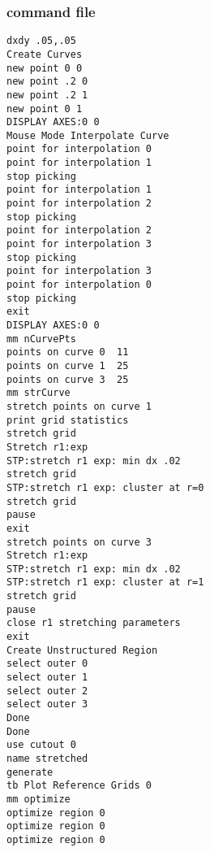 \documentclass[letterpaper,12pt]{article}
\begin{document}
\subsubsection{command file}
\begin{verbatim}
dxdy .05,.05
Create Curves
new point 0 0
new point .2 0
new point .2 1
new point 0 1
DISPLAY AXES:0 0
Mouse Mode Interpolate Curve
point for interpolation 0
point for interpolation 1
stop picking
point for interpolation 1
point for interpolation 2
stop picking
point for interpolation 2
point for interpolation 3
stop picking
point for interpolation 3
point for interpolation 0
stop picking
exit
DISPLAY AXES:0 0
mm nCurvePts
points on curve 0  11
points on curve 1  25
points on curve 3  25
mm strCurve
stretch points on curve 1
print grid statistics
stretch grid
Stretch r1:exp
STP:stretch r1 exp: min dx .02
stretch grid
STP:stretch r1 exp: cluster at r=0
stretch grid
pause
exit
stretch points on curve 3
Stretch r1:exp
STP:stretch r1 exp: min dx .02
STP:stretch r1 exp: cluster at r=1
stretch grid
pause
close r1 stretching parameters
exit
Create Unstructured Region
select outer 0
select outer 1
select outer 2
select outer 3
Done
Done
use cutout 0
name stretched
generate
tb Plot Reference Grids 0
mm optimize
optimize region 0
optimize region 0
optimize region 0
\end{verbatim}
 

\end{document}
